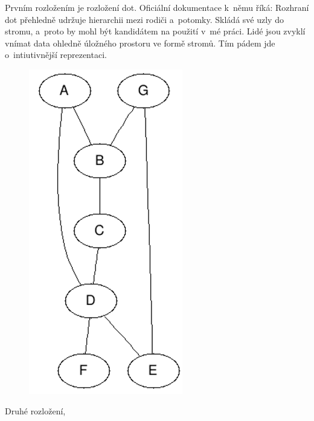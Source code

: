 \documentclass[color,table,oneside,nolot,nolof]{fithesis}
\begin{document}
	Prvním rozložením je rozložení dot. Oficiální dokumentace k~němu říká:
	\cite{graphviz_layout} 
	Rozhraní dot přehledně udržuje hierarchii mezi rodiči a~potomky. Skládá
	své uzly do stromu, a~proto by mohl být kandidátem na použití v~mé práci. Lidé jsou zvyklí vnímat data ohledně úložného prostoru ve formě stromů. Tím pádem jde o~intiutivnější
	reprezentaci.

\begin{figure}
	\centering
	\includegraphics[width=0.6\textwidth]{pictures/dot_example.png} 
\end{figure}
	Druhé rozložení, \cite{graphviz_layout}
\end{document}
